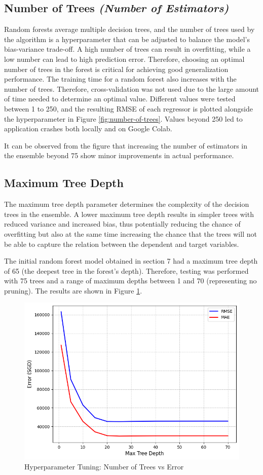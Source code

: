 \documentclass[[12pt,conference]{IEEEtran}
\begin{document}
\subsection{Number of Trees \textit{(Number of Estimators)}}
Random forests average multiple decision trees, and the number of trees used by the algorithm is a hyperparameter that can be adjusted to balance the model's bias-variance trade-off. A high number of trees can result in overfitting, while a low number can lead to high prediction error. Therefore, choosing an optimal number of trees in the forest is critical for achieving good generalization performance.
The training time for a random forest also increases with the number of trees. Therefore, cross-validation was not used due to the large amount of time needed to determine an optimal value. Different values were tested between 1 to 250, and the resulting RMSE of each regressor is plotted alongside the hyperparameter in Figure \ref{fig:number-of-trees}. Values beyond 250 led to application crashes both locally and on Google Colab.


It can be observed from the figure that increasing the number of estimators in the ensemble beyond 75 show minor improvements in actual performance. 

\subsection{Maximum Tree Depth}
The maximum tree depth parameter determines the complexity of the decision trees in the ensemble. A lower maximum tree depth results in simpler trees with reduced variance and increased bias, thus potentially reducing the chance of overfitting but also at the same time increasing the chance that the trees will not be able to capture the relation between the dependent and target variables.

The initial random forest model obtained in section 7 had a maximum tree depth of 65 (the deepest tree in the forest's depth). Therefore, testing was performed with 75 trees and a range of maximum depths between 1 and 70 (representing no pruning). The results are shown in Figure \ref{fig:max-tree-depth}.

\begin{figure}[H]
    \centering
    \includegraphics[width=0.85\linewidth]{4_random_forest_max_tree_depth.png}
    \caption{Hyperparameter Tuning: Number of Trees vs Error}
    \label{fig:max-tree-depth}
\end{figure}
\end{document}
